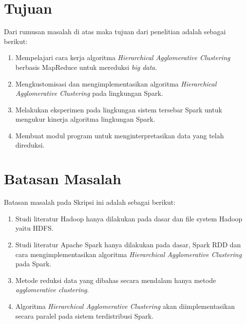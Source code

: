 \section{Tujuan}
\label{sec:tujuan}
Dari rumusan masalah di atas maka tujuan dari penelitian adalah sebagai berikut:
\begin{enumerate}

\item Mempelajari cara kerja algoritma  {\it Hierarchical Agglomerative Clustering} berbasis MapReduce untuk mereduksi {\it big data}.

\item Mengkustomisasi dan mengimplementasikan algoritma {\it Hierarchical Agglomerative Clustering} pada lingkungan Spark.

\item Melakukan eksperimen pada lingkungan sistem tersebar Spark untuk mengukur kinerja algoritma lingkungan Spark.

\item Membuat modul program untuk menginterpretasikan data yang telah direduksi.

\end{enumerate}



\section{Batasan Masalah}
\label{sec:batasan}
Batasan masalah pada Skripsi ini adalah sebagai berikut:
\begin{enumerate}

\item Studi literatur Hadoop hanya dilakukan pada dasar dan file system Hadoop yaitu HDFS.

\item Studi literatur Apache Spark hanya dilakukan pada dasar, Spark RDD dan cara mengimplementasikan algoritma {\it Hierarchical Agglomerative Clustering} pada Spark.

\item Metode reduksi data yang dibahas secara mendalam hanya metode {\it agglomerative clustering}.

\item Algoritma {\it Hierarchical Agglomerative Clustering} akan diimplementasikan secara paralel pada sistem terdistribusi Spark.

\end{enumerate}


